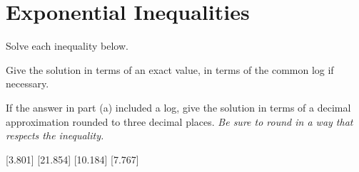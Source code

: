 \section*{Exponential Inequalities}
Solve each inequality below.
\begin{clist}
\item Give the solution in terms of an exact value, in terms of the common log if necessary.
\item If the answer in part (a) included a log, give the solution in terms of a decimal approximation rounded to three decimal places. \emph{Be sure to round in a way that respects the inequality.}
\end{clist}
\begin{smenum}
\mitemxxxx
{}
{}
{[3.801]}
{[21.854]}
\mitemxx
{[10.184]}
{[7.767]}
\end{smenum}

